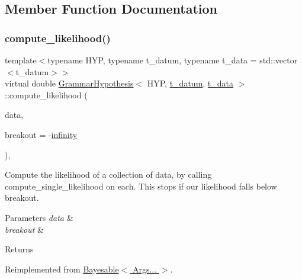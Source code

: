 \subsection{Member Function Documentation}
\mbox{\label{class_grammar_hypothesis_ae565db71afc24d042450e9ed471b4908}} 
\subsubsection{\texorpdfstring{compute\+\_\+likelihood()}{compute\_likelihood()}}
{\footnotesize\ttfamily template$<$typename H\+YP, typename t\+\_\+datum, typename t\+\_\+data = std\+::vector$<$t\+\_\+datum$>$$>$ \\
virtual double \hyperlink{class_grammar_hypothesis}{Grammar\+Hypothesis}$<$ H\+YP, \hyperlink{class_bayesable_a7c93a2eeab708378eb321745908718d4}{t\+\_\+datum}, \hyperlink{class_bayesable_a70a593a67c7d43239ecc06bb4fd06a6b}{t\+\_\+data} $>$\+::compute\+\_\+likelihood (\begin{DoxyParamCaption}\item[{const \hyperlink{class_bayesable_a70a593a67c7d43239ecc06bb4fd06a6b}{t\+\_\+data} \&}]{data,  }\item[{const double}]{breakout = {\ttfamily -\/\hyperlink{_numerics_8h_a1bb1e42ae1b40cad6e99da0aab8a5576}{infinity}} }\end{DoxyParamCaption})\hspace{0.3cm}{\ttfamily [inline]}, {\ttfamily [virtual]}}



Compute the likelihood of a collection of data, by calling compute\+\_\+single\+\_\+likelihood on each. This stops if our likelihood falls below breakout. 


\begin{DoxyParams}{Parameters}
{\em data} & \\
\hline
{\em breakout} & \\
\hline
\end{DoxyParams}
\begin{DoxyReturn}{Returns}

\end{DoxyReturn}


Reimplemented from \hyperlink{class_bayesable_af9547335ae15a5068b10d29aee5056ae}{Bayesable$<$ Args... $>$}.

